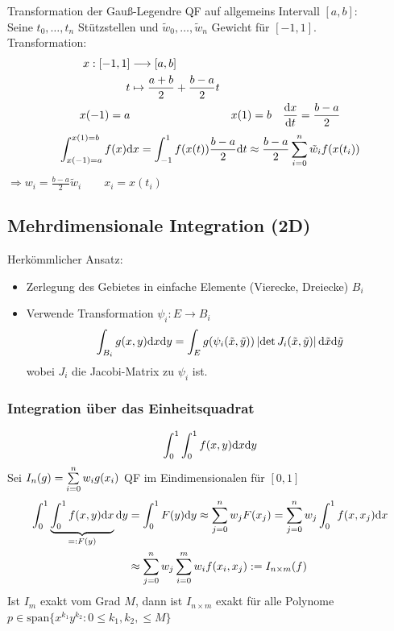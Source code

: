 Transformation der Gauß-Legendre QF auf allgemeins Intervall $[a,b]$:\\
Seine $t_0,\ldots,t_n$ Stützstellen und $\tilde{w}_0,\ldots,\tilde{w}_n$ Gewicht für $[-1,1]$.\\
Transformation: 
\begin{align*}
  x:[-1,1] &\longrightarrow [a,b]\\
  t &\mapsto \frac{a+b}{2} + \frac{b-a}{2} t\\
  x(-1) = a && x(1) = b && \frac{\mathrm{d}x}{\mathrm{d}t} = \frac{b-a}{2} 
\end{align*}
\begin{align*}
  \int_{x(-1)=a}^{x(1)=b} f(x) \mathrm{d}x = \int_{-1}^1 f(x(t)) \frac{b-a}{2} \mathrm{d}t \approx
    \frac{b-a}{2} \sum\limits_{i=0}^{n}{\tilde{w}_i f(x(t_i))}
\end{align*}
$\Rightarrow w_i = \frac{b-a}{2} \tilde{w}_i \qquad x_i = x(t_i)$

\subsection{Mehrdimensionale Integration (2D)}
Herkömmlicher Ansatz:
\begin{itemize}
  \item Zerlegung des Gebietes in einfache Elemente (Vierecke, Dreiecke) $B_i$
  \item Verwende Transformation $\psi_i: E \longrightarrow B_i$\begin{align*}
      \int_{B_i} g(x,y) \mathrm{d}x\mathrm{d}y = \int_E g(\psi_i(\tilde{x},\tilde{y})) \left| \det J_i(\tilde{x},\tilde{y}) \right| \mathrm{d}\tilde{x}\mathrm{d}\tilde{y}
  \end{align*} wobei $J_i$ die Jacobi-Matrix zu $\psi_i$ ist.
\end{itemize}
\subsubsection{Integration über das Einheitsquadrat}
\begin{align*}
  \int_0^1 \int_0^1 f(x,y) \mathrm{d}x\mathrm{d}y
\end{align*}
Sei $I_n(g) = \sum\limits_{i=0}^{n}{w_i g(x_i)}$ QF im Eindimensionalen für $[0,1]$
\begin{align*}
  \int_0^1 \underbrace{\int_0^1 f(x,y) \mathrm{d}x}_{=:F(y)} \mathrm{d}y &= \int_0^1 F(y) \mathrm{d}y \approx \sum\limits_{j=0}^{n}{w_j F(x_j)} = \sum\limits_{j=0}^{n}{w_j \int_0^1 f(x, x_j) \mathrm{d}x}\\
    &\approx \sum\limits_{j=0}^{n}{w_j \sum_{i=0}^m w_i f(x_i, x_j) } := I_{n \times m}(f)
\end{align*}
Ist $I_m$ exakt vom Grad $M$, dann ist $I_{n \times m}$ exakt für alle Polynome\\
$p \in \mathrm{span} \{x^{k_1}y^{k_2}: 0 \leq k_1, k_2, \leq M\}$

